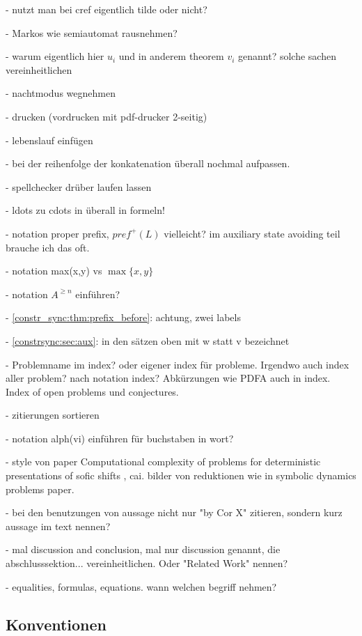 {	- nutzt man bei cref eigentlich tilde oder nicht?
	
	- Markos wie semiautomat rausnehmen?	
	
	- warum eigentlich hier $u_i$ und in anderem theorem $v_i$ genannt? solche sachen vereinheitlichen
	
	- nachtmodus wegnehmen
	
	- drucken (vordrucken mit pdf-drucker 2-seitig)
		
	- lebenslauf einfügen	
	
	- bei der reihenfolge der konkatenation überall nochmal aufpassen. 	
	
	- spellchecker drüber laufen lassen

	- ldots zu cdots in überall in formeln!	
	
	- notation proper prefix, $pref^+(L)$ vielleicht? im auxiliary state avoiding teil brauche ich das oft.
	
	- notation max(x,y) vs $\max\{x,y\}$
	
	- notation $A^{\ge n}$ einführen?
		
	- \cref{constr_sync:thm:prefix_before}: achtung, zwei labels
	
	- \cref{constrsync:sec:aux}: in den sätzen oben mit w statt v bezeichnet
	
	- Problemname im index? oder eigener index für probleme. Irgendwo auch index aller problem? nach notation index? Abkürzungen wie PDFA auch in index. Index of open problems und conjectures.
	
			
	- zitierungen sortieren
		
	- notation alph(vi) einführen für buchstaben in wort?
	
	
	- style von paper Computational complexity of problems for deterministic presentations of sofic shifts , cai. bilder von reduktionen wie in symbolic dynamics problems paper.
	 
	
	- bei den benutzungen von aussage nicht nur "by Cor X" zitieren, sondern kurz aussage im text nennen?
	
	
	- mal discussion and conclusion, mal nur discussion genannt, die abschlusssektion... vereinheitlichen. Oder "Related Work" nennen?
	
	
	- equalities, formulas, equations. wann welchen begriff nehmen?
}

\subsection{Konventionen}

